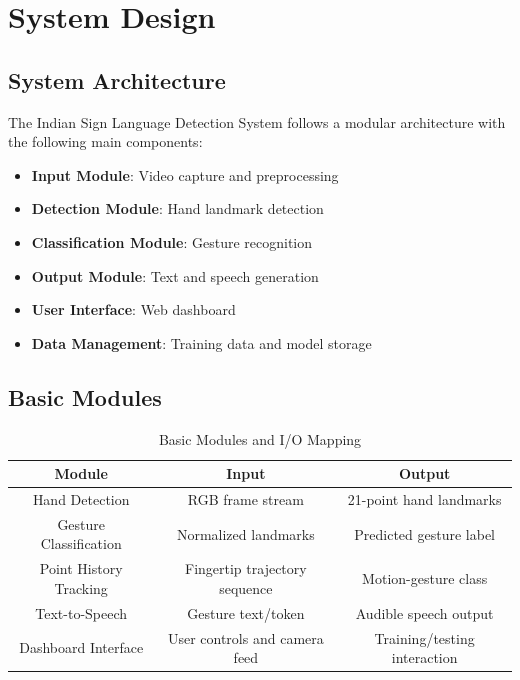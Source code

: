 \chapter{System Design}

\section{System Architecture}

The Indian Sign Language Detection System follows a modular architecture with the following main components:

\begin{itemize}
    \item \textbf{Input Module}: Video capture and preprocessing
    \item \textbf{Detection Module}: Hand landmark detection
    \item \textbf{Classification Module}: Gesture recognition
    \item \textbf{Output Module}: Text and speech generation
    \item \textbf{User Interface}: Web dashboard
    \item \textbf{Data Management}: Training data and model storage
\end{itemize}

\section{Basic Modules}

\begin{table}[H]
\centering
\begin{tabular}{|c|c|c|}
\hline
\textbf{Module} & \textbf{Input} & \textbf{Output} \\
\hline
Hand Detection & RGB frame stream & 21-point hand landmarks \\
\hline
Gesture Classification & Normalized landmarks & Predicted gesture label \\
\hline
Point History Tracking & Fingertip trajectory sequence & Motion-gesture class \\
\hline
Text-to-Speech & Gesture text/token & Audible speech output \\
\hline
Dashboard Interface & User controls and camera feed & Training/testing interaction \\
\hline
\end{tabular}
\caption{Basic Modules and I/O Mapping}
\end{table}

